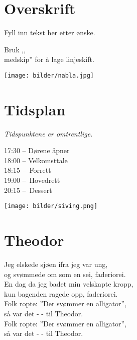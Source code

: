 \documentclass{article}
\begin{document}
\pagestyle{empty}

\begin{landscape}
\begin{multicols}{3}

\begin{center}

\normalsize


\section*{Overskrift}
Fyll inn tekst her etter ønske.

\medskip
Bruk ,,\\medskip'' for å lage linjeskift.

\begin{center}
\texttt{[image: bilder/nabla.jpg]}
\end{center}

\columnbreak
\section*{Tidsplan}
\emph{Tidspunktene er omtrentlige.}

17:30 – Dørene åpner \\
18:00 – Velkomsttale \\
18:15 – Forrett \\
19:00 – Hovedrett \\
20:15 – Dessert \\

\begin{center}
\texttt{[image: bilder/siving.png]}
\end{center}

\columnbreak
\section*{Theodor}
Jeg elskede sjøen ifra jeg var ung,\\
og svømmede om som en sei, faderiorei.\\
En dag da jeg badet min velskapte kropp,\\
kun bagenden ragede opp, faderiorei.\\
Folk ropte: ”Der svømmer en alligator”,\\
så var det - - til Theodor.\\
Folk ropte: ”Der svømmer en alligator”,\\
så var det - - til Theodor.\\



\end{center}
\end{multicols}
\end{landscape}
\end{document}
